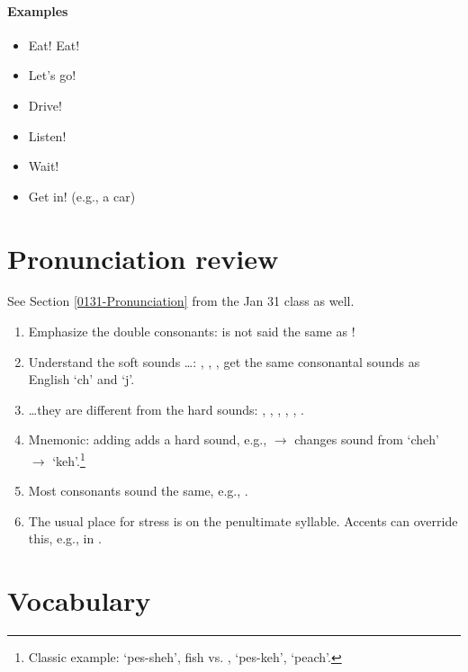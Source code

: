 \paragraph{Examples}
\begin{itemize}
	\item Eat! Eat!        \\
	\item Let's go!        \\
	\item Drive!           \\
	\item Listen!          \\
	\item Wait!            \\
	\item Get in! (e.g., a car) \\
\end{itemize}

\section{Pronunciation review} \label{0328-Pronunciation}
See Section \ref{0131-Pronunciation} from the Jan 31 class as well.

\begin{enumerate}
  \item Emphasize the double consonants:  is not said the same as !
  \item Understand the soft sounds \ldots: , , ,  get the same 
	  consonantal sounds as English `ch' and `j'. 
  \item \ldots they are different from the hard sounds: , , , , , .
  \item Mnemonic: adding  adds a hard sound, e.g.,  $\rightarrow$  changes sound from `cheh' $\rightarrow$ `keh'.\footnote{Classic example:  `pes-sheh', fish vs. , `pes-keh', `peach'.}
  \item Most consonants sound the same, e.g., .
  \item The usual place for stress is on the penultimate syllable. Accents can override this, e.g., in .
\end{enumerate}

\section{Vocabulary} \label{0328-Vocabulary}
